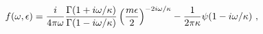 \begin{equation}\label{2.25a}
f(\omega,\epsilon)={i \over 4\pi \omega} { \Gamma(1+i\omega/\kappa)
\over \Gamma(1-i\omega/\kappa)}
\left({m \epsilon \over 2}\right)^{-2i\omega/\kappa}
-{1 \over 2\pi\kappa}\psi(1-i\omega/\kappa)~,
\end{equation}

